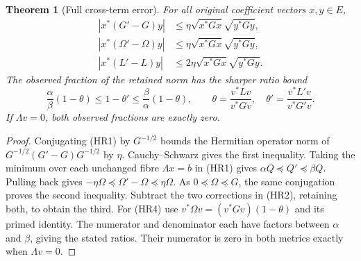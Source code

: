 \documentclass[11pt]{article}
\newtheorem{theorem}{Theorem}
\begin{document}
\begin{theorem}[Full cross-term error]
For all original coefficient vectors $x,y\in E$,
\begin{equation}\tag{HR3}
 \begin{aligned}
 |x^*(G'-G)y|&\le\eta\sqrt{x^*Gx}\sqrt{y^*Gy},\\
 |x^*(\Omega'-\Omega)y|&\le\eta\sqrt{x^*Gx}\sqrt{y^*Gy},\\
 |x^*(L'-L)y|&\le2\eta\sqrt{x^*Gx}\sqrt{y^*Gy}.
 \end{aligned}
\end{equation}
The observed fraction of the retained norm has the sharper ratio bound
\begin{equation}\tag{HR4}
 \frac\alpha\beta(1-\theta)\le1-\theta'
                 \le\frac\beta\alpha(1-\theta),\qquad
 \theta=\frac{v^*Lv}{v^*Gv},\quad
 \theta'=\frac{v^*L'v}{v^*G'v}.
\end{equation}
If $\Lambda v=0$, both observed fractions are exactly zero.
\end{theorem}
\begin{proof}
Conjugating (HR1) by $G^{-1/2}$ bounds the Hermitian operator norm of
$G^{-1/2}(G'-G)G^{-1/2}$ by $\eta$. Cauchy--Schwarz gives the
first inequality. Taking the minimum over each unchanged fibre
$\Lambda x=b$ in (HR1) gives $\alpha Q\preceq Q'\preceq\beta Q$.
Pulling back gives
$-\eta\Omega\preceq\Omega'-\Omega\preceq\eta\Omega$.
As $0\preceq\Omega\preceq G$, the same conjugation proves the
second inequality. Subtract the two corrections in (HR2), retaining
both, to obtain the third. For (HR4) use
$v^*\Omega v=(v^*Gv)(1-\theta)$ and its primed identity. The
numerator and denominator each have factors between $\alpha$ and
$\beta$, giving the stated ratios. Their numerator is zero in both
metrics exactly when $\Lambda v=0$.
\end{proof}
\end{document}
